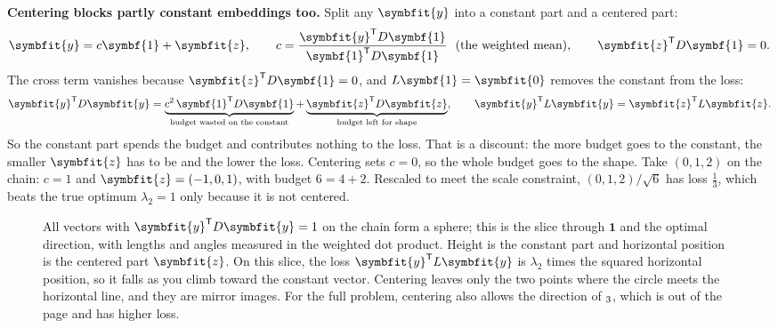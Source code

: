 \documentclass[11pt]{article}
\newcommand{\bm}[1]{\symbfit{#1}}
\let\vv\relax\newcommand{\vv}{\bm{v}}
\newcommand{\one}{\symbf{1}}
\newcommand{\T}{^{\mathsf T}}
\begin{document}
\textbf{Centering blocks partly constant embeddings too.} Split any $\bm y$ into a constant part and a centered part:
\[
\bm y=c\one+\bm z,\qquad c=\frac{\bm y\T D\one}{\one\T D\one}\ \ (\text{the weighted mean}),\qquad \bm z\T D\one=0 .
\]
The cross term vanishes because $\bm z\T D\one=0$, and $L\one=\bm0$ removes the constant from the loss:
\[
\bm y\T D\bm y=\underbrace{c^2\,\one\T D\one}_{\text{budget wasted on the constant}}+\underbrace{\bm z\T D\bm z}_{\text{budget left for shape}},
\qquad
\bm y\T L\bm y=\bm z\T L\bm z .
\]
So the constant part spends the budget and contributes nothing to the loss. That is a discount: the more budget goes to the constant, the smaller $\bm z$ has to be and the lower the loss. Centering sets $c=0$, so the whole budget goes to the shape. Take $(0,1,2)$ on the chain: $c=1$ and $\bm z=(-1,0,1)$, with budget $6=4+2$. Rescaled to meet the scale constraint, $(0,1,2)/\sqrt6$ has loss $\tfrac13$, which beats the true optimum $\lambda_2=1$ only because it is not centered.

\begin{figure}[htbp]
\centering
{}
\caption{All vectors with $\bm y\T D\bm y=1$ on the chain form a sphere; this is the slice through $\one$ and the optimal direction, with lengths and angles measured in the weighted dot product. Height is the constant part and horizontal position is the centered part $\bm z$. On this slice, the loss $\bm y\T L\bm y$ is $\lambda_2$ times the squared horizontal position, so it falls as you climb toward the constant vector. Centering leaves only the two points where the circle meets the horizontal line, and they are mirror images. For the full problem, centering also allows the direction of $\vv_3$, which is out of the page and has higher loss.}
\label{fig:dorth}
\end{figure}
\end{document}

